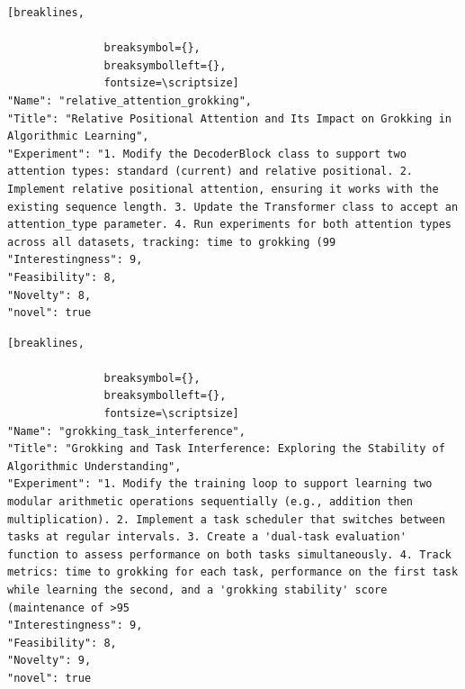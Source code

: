 \begin{tcolorbox}[
  breakable,
  colback  = blue!5!white,
  colframe = blue!75!black,
  title    = {Idea 35/50 - \texttt{relative\_attention\_grokking}},
  fontupper=\scriptsize\ttfamily,
]
\begin{Verbatim}[breaklines,

               breaksymbol={},
               breaksymbolleft={},
               fontsize=\scriptsize]
"Name": "relative_attention_grokking",
"Title": "Relative Positional Attention and Its Impact on Grokking in Algorithmic Learning",
"Experiment": "1. Modify the DecoderBlock class to support two attention types: standard (current) and relative positional. 2. Implement relative positional attention, ensuring it works with the existing sequence length. 3. Update the Transformer class to accept an attention_type parameter. 4. Run experiments for both attention types across all datasets, tracking: time to grokking (99
"Interestingness": 9,
"Feasibility": 8,
"Novelty": 8,
"novel": true
\end{Verbatim}
\end{tcolorbox}

\begin{tcolorbox}[
  breakable,
  colback  = blue!5!white,
  colframe = blue!75!black,
  title    = {Idea 36/50 - \texttt{grokking\_task\_interference}},
  fontupper=\scriptsize\ttfamily,
]
\begin{Verbatim}[breaklines,

               breaksymbol={},
               breaksymbolleft={},
               fontsize=\scriptsize]
"Name": "grokking_task_interference",
"Title": "Grokking and Task Interference: Exploring the Stability of Algorithmic Understanding",
"Experiment": "1. Modify the training loop to support learning two modular arithmetic operations sequentially (e.g., addition then multiplication). 2. Implement a task scheduler that switches between tasks at regular intervals. 3. Create a 'dual-task evaluation' function to assess performance on both tasks simultaneously. 4. Track metrics: time to grokking for each task, performance on the first task while learning the second, and a 'grokking stability' score (maintenance of >95
"Interestingness": 9,
"Feasibility": 8,
"Novelty": 9,
"novel": true
\end{Verbatim}
\end{tcolorbox}

